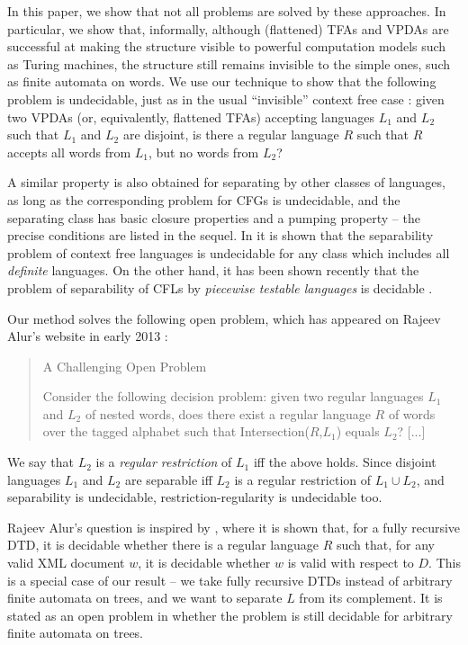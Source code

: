 \documentclass{article}
\begin{document}
In this paper, we show that not all problems are solved by these approaches. In
particular, we show that, informally,
although (flattened) TFAs and VPDAs are successful at making
the structure visible to powerful computation models such as
Turing machines, the structure still remains invisible to the simple
ones, such as finite automata on words. We use our technique to show that the following
problem is undecidable, just as in the usual ``invisible'' context free case
\cite{hunt, szymanski}:
given two VPDAs (or, equivalently, flattened TFAs) accepting languages $L_1$ and $L_2$
such that $L_1$ and $L_2$ are disjoint, is there a regular language $R$ such that
$R$ accepts all words from $L_1$, but no words from $L_2$?

A similar property
is also obtained for separating by other classes of languages, as long as the
corresponding problem for CFGs is undecidable, and the separating class has basic
closure properties and a pumping property -- the precise conditions are listed in the
sequel.
In \cite{hunt} it is shown that the separability problem of
context free languages is undecidable for any class which includes all
{\it definite} languages. On the other hand, 
it has been shown recently that the problem of separability of CFLs by
\emph{piecewise testable languages} is decidable \cite{wojtekczerwinski}.

Our method solves the following open problem, 
which has appeared on Rajeev Alur's website in early 2013 \cite{alur2013}:

\begin{quote}
A Challenging Open Problem

Consider the following decision problem: given two regular languages $L_1$ and $L_2$ of nested
words, does there exist a regular language $R$ of words over the tagged alphabet such that
Intersection($R$,$L_1$) equals $L_2$? [...]\end{quote}

We say that $L_2$ is a \emph{regular restriction} of $L_1$
iff the above holds.
Since disjoint languages $L_1$ and $L_2$ are separable iff $L_2$ is a regular
restriction of $L_1 \cup L_2$, and separability is undecidable,
restriction-regularity is undecidable too.

Rajeev Alur's question is inspired by \cite{streaming-pods}, where
it is shown that, for a fully recursive DTD, it is decidable whether
there is a regular language $R$ such that, for any valid XML document $w$,
it is decidable whether $w$ is valid with respect to $D$. This is a special case
of our result -- we take fully recursive DTDs instead of arbitrary finite automata
on trees, and we want to separate $L$ from its complement. It is stated as an open
problem in \cite{streaming-pods} whether the problem is still decidable for arbitrary
finite automata on trees.
\end{document}
